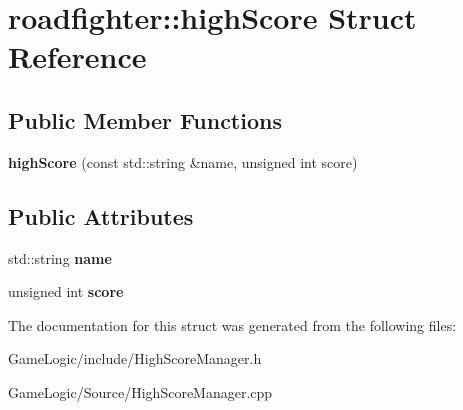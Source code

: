 \hypertarget{structroadfighter_1_1highScore}{}\section{roadfighter\+:\+:high\+Score Struct Reference}
\label{structroadfighter_1_1highScore}
\subsection*{Public Member Functions}
\begin{DoxyCompactItemize}
\item 
\mbox{\label{structroadfighter_1_1highScore_a3a67cd6ffadc68d7ef497a2d8bd83c05}} 
{\bfseries high\+Score} (const std\+::string \&name, unsigned int score)
\end{DoxyCompactItemize}
\subsection*{Public Attributes}
\begin{DoxyCompactItemize}
\item 
\mbox{\label{structroadfighter_1_1highScore_a9d1ffd2a7ea8a0eaedda4668be5c4994}} 
std\+::string {\bfseries name}
\item 
\mbox{\label{structroadfighter_1_1highScore_a244094acbf1e4bac6af7983ff732c678}} 
unsigned int {\bfseries score}
\end{DoxyCompactItemize}


The documentation for this struct was generated from the following files\+:\begin{DoxyCompactItemize}
\item 
Game\+Logic/include/High\+Score\+Manager.\+h\item 
Game\+Logic/\+Source/High\+Score\+Manager.\+cpp\end{DoxyCompactItemize}
